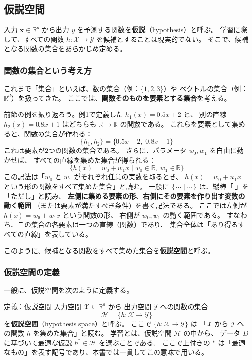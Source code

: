 \subsection{仮説空間}

入力 $\bm{x} \in \mathbb{R}^d$ から出力 $y$ を予測する関数を\textbf{仮説}（hypothesis）と呼ぶ。
学習に際して、すべての関数 $h : \mathcal{X} \to \mathcal{Y}$ を候補とすることは現実的でない。
そこで、候補となる関数の集合をあらかじめ定める。

\subsubsection{関数の集合という考え方}

これまで「集合」といえば、数の集合（例：$\{1, 2, 3\}$）や
ベクトルの集合（例：$\mathbb{R}^d$）を扱ってきた。
ここでは、\textbf{関数そのものを要素とする集合}を考える。

前節の例を振り返ろう。例1で定義した $h_1(x) = 0.5x + 2$ と、
別の直線 $h_2(x) = 0.8x + 1$ はどちらも $\mathbb{R} \to \mathbb{R}$ の関数である。
これらを要素として集めると、関数の集合が作れる：
\begin{equation}
  \{ h_1, h_2 \} = \{ 0.5x + 2,\; 0.8x + 1 \}
\end{equation}
これは要素が2つの関数の集合である。
さらに、パラメータ $w_0, w_1$ を自由に動かせば、
すべての直線を集めた集合が得られる：
\begin{equation}
  \{ h(x) = w_0 + w_1 x \mid w_0 \in \mathbb{R},\; w_1 \in \mathbb{R} \}
\end{equation}
この記法は「$w_0$ と $w_1$ がそれぞれ任意の実数を取るとき、
$h(x) = w_0 + w_1 x$ という形の関数をすべて集めた集合」と読む。
一般に $\{\, \cdots \mid \cdots \,\}$ は、縦棒「$\mid$」を「ただし」と読み、
\textbf{左側に集める要素の形}、\textbf{右側にその要素を作り出す変数の動く範囲}
（または要素が満たすべき条件）を書く記法である。
ここでは左側が $h(x) = w_0 + w_1 x$ という関数の形、
右側が $w_0, w_1$ の動く範囲である。
すなわち、この集合の各要素は一つの直線（関数）であり、
集合全体は「あり得るすべての直線」を表している。

このように、候補となる関数をすべて集めた集合を\textbf{仮説空間}と呼ぶ。

\subsubsection{仮説空間の定義}

一般に、仮説空間を次のように定義する。

\begin{itembox}[l]{定義：仮説空間}
入力空間 $\mathcal{X} \subseteq \mathbb{R}^d$ から
出力空間 $\mathcal{Y}$ への関数の集合
\begin{equation}
  \mathcal{H} = \{ h : \mathcal{X} \to \mathcal{Y} \}
\end{equation}
を\textbf{仮説空間}（hypothesis space）と呼ぶ。
ここで $\{ h : \mathcal{X} \to \mathcal{Y} \}$ は
「$\mathcal{X}$ から $\mathcal{Y}$ への関数 $h$ を集めた集合」と読む。
学習とは、仮説空間 $\mathcal{H}$ の中から、
データ $D$ に基づいて最適な仮説 $h^* \in \mathcal{H}$ を選ぶことである。
ここで上付きの $*$ は「最適なもの」を表す記号であり、本書では一貫してこの意味で用いる。
\end{itembox}

